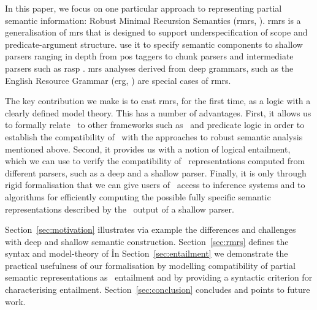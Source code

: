 In this paper, we focus on one particular approach to representing
partial semantic information:
Robust Minimal Recursion Semantics ({\sc rmrs},
\cite{copestake:2003}).  {\sc rmrs} is a generalisation of {\sc mrs}
\cite{copestake:etal:2005} that is designed to support underspecification
of scope and predicate-argument structure.
\cite{copestake:2003,frank:2004} use it to
specify semantic components to shallow parsers
ranging in depth from {\sc pos} taggers to chunk parsers  
and intermediate parsers such as {\sc rasp}
\cite{briscoe:etal:2006}.  {\sc mrs} analyses
derived from deep grammars, such as the English Resource Grammar
({\sc erg}, \cite{copestake:flickinger:2000}) are
special cases of 
{\sc rmrs}.

The key contribution we make is to cast {\sc rmrs}, for the first
time, as a logic with a clearly defined model theory.  This has a
number of advantages.  First, it allows us to formally relate \rmrs\ to
other frameworks such as \mrs\ and predicate logic in order to
establish the compatibility of \rmrs\ with the approaches to robust
semantic analysis mentioned above.  Second, it provides us with a
notion of logical entailment, which we can use to verify the
compatibility of \rmrs\ representations computed from different
parsers, such as a deep and a shallow parser.  Finally, it is only
through rigid formalisation that we can give users of \rmrs\ access to
inference systems and to algorithms for efficiently computing the
possible fully specific semantic representations described by the \rmrs\
output of a shallow parser.

Section~\ref{sec:motivation} illustrates via example the differences
and challenges with deep and 
shallow semantic construction.  
Section~\ref{sec:rmrs} defines the syntax and
model-theory of \rmrs\.  In Section~\ref{sec:entailment} we
demonstrate 
the practical usefulness of our formalisation 
by modelling compatibility of
partial semantic representations as \rmrs\ entailment and by providing a
syntactic criterion for characterising entailment.
Section~\ref{sec:conclusion} concludes and points to future work.


